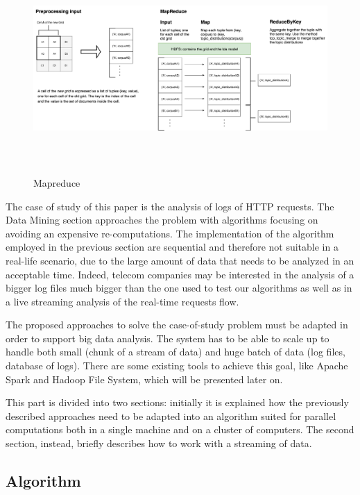 \begin{figure}[h]
	\includegraphics[width=\textwidth, height = 8cm]{images/mapreducefinfin}
	\caption{Mapreduce}
\end{figure}

The case of study of this paper is the analysis of logs of HTTP requests. The Data Mining section approaches the problem with algorithms focusing on avoiding an expensive re-computations. The implementation of the algorithm employed in the previous section are sequential and therefore not suitable in a real-life scenario, due to the large amount of data that needs to be analyzed in an acceptable time. Indeed, telecom companies may be interested in the analysis of a bigger log files much bigger than the one used to test our algorithms as well as in a live streaming analysis of the real-time requests flow. 

The proposed approaches to solve the case-of-study problem must be adapted in order to support big data analysis. The system has to be able to scale up to handle both small (chunk of a stream of data) and huge batch of data (log files, database of logs). There are some existing tools to achieve this goal, like Apache Spark and Hadoop File System, which will be presented later on. 

This part is divided into two sections: initially it is explained how the previously described approaches need to be adapted into an algorithm suited for parallel computations both in a single machine and on a cluster of computers. The second section, instead, briefly describes how to work with a streaming of data.


\subsection{Algorithm}

